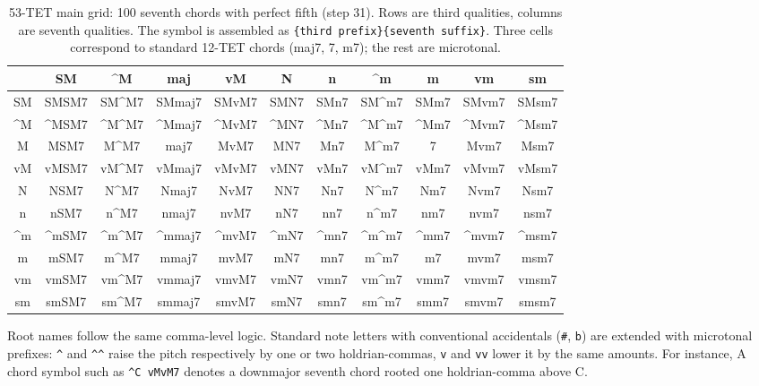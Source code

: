 \documentclass{aimc2026}
\begin{document}
\begin{table}[h]
\centering
\footnotesize
\caption{53-TET main grid: 100 seventh chords with perfect fifth (step 31). Rows are third qualities, columns are seventh qualities. The symbol is assembled as \texttt{\{third prefix\}\{seventh suffix\}}. Three cells correspond to standard 12-TET chords (maj7, 7, m7); the rest are microtonal.}
\label{tab:chord_examples}
\begin{tabular}{c|cccccccccc}
\toprule
 & SM & \^{}M & maj & vM & N & n & \^{}m & m & vm & sm \\
\midrule
SM  & SMSM7  & SM\^{}M7  & SMmaj7  & SMvM7  & SMN7  & SMn7  & SM\^{}m7  & SMm7  & SMvm7  & SMsm7  \\
\^{}M  & \^{}MSM7  & \^{}M\^{}M7  & \^{}Mmaj7  & \^{}MvM7  & \^{}MN7  & \^{}Mn7  & \^{}M\^{}m7  & \^{}Mm7  & \^{}Mvm7  & \^{}Msm7  \\
M   & MSM7   & M\^{}M7   & maj7   & MvM7   & MN7   & Mn7   & M\^{}m7   & 7   & Mvm7   & Msm7   \\
vM  & vMSM7  & vM\^{}M7  & vMmaj7  & vMvM7  & vMN7  & vMn7  & vM\^{}m7  & vMm7  & vMvm7  & vMsm7  \\
N   & NSM7   & N\^{}M7   & Nmaj7   & NvM7   & NN7   & Nn7   & N\^{}m7   & Nm7   & Nvm7   & Nsm7   \\
n   & nSM7   & n\^{}M7   & nmaj7   & nvM7   & nN7   & nn7   & n\^{}m7   & nm7   & nvm7   & nsm7   \\
\^{}m  & \^{}mSM7  & \^{}m\^{}M7  & \^{}mmaj7  & \^{}mvM7  & \^{}mN7  & \^{}mn7  & \^{}m\^{}m7  & \^{}mm7  & \^{}mvm7  & \^{}msm7  \\
m   & mSM7   & m\^{}M7   & mmaj7   & mvM7   & mN7   & mn7   & m\^{}m7   & m7   & mvm7   & msm7   \\
vm  & vmSM7  & vm\^{}M7  & vmmaj7  & vmvM7  & vmN7  & vmn7  & vm\^{}m7  & vmm7  & vmvm7  & vmsm7  \\
sm  & smSM7  & sm\^{}M7  & smmaj7  & smvM7  & smN7  & smn7  & sm\^{}m7  & smm7  & smvm7  & smsm7  \\
\bottomrule
\end{tabular}
\end{table}

Root names follow the same comma-level logic. Standard note letters with conventional accidentals (\texttt{\#}, \texttt{b}) are extended with microtonal prefixes: \texttt{\^{}} and \texttt{\^{}\^{}} raise the pitch respectively by one or two holdrian-commas, \texttt{v} and \texttt{vv} lower it by the same amounts. For instance, A chord symbol such as \texttt{\^{}C\,vMvM7} denotes a downmajor seventh chord rooted one holdrian-comma above C.
\end{document}
